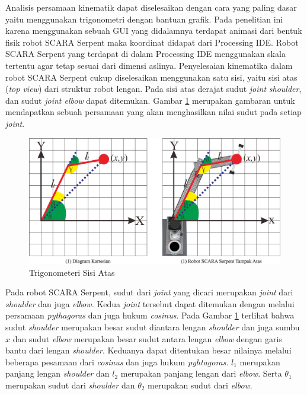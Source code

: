 Analisis persamaan kinematik dapat diselesaikan dengan cara yang paling dasar yaitu menggunakan trigonometri dengan bantuan grafik. Pada penelitian ini karena menggunakan sebuah GUI yang didalamnya terdapat animasi dari bentuk fisik robot SCARA Serpent maka koordinat didapat dari Processing IDE. Robot SCARA Serpent yang terdapat di dalam Processing IDE menggunakan skala tertentu agar tetap sesuai dari dimensi aslinya. Penyelesaian kinematika dalam robot SCARA Serpent cukup diselesaikan menggunakan satu sisi, yaitu sisi atas (\textit{top view}) dari struktur robot lengan. Pada sisi atas derajat sudut \textit{joint} \textit{shoulder}, dan sudut \textit{joint elbow} dapat ditemukan. Gambar \ref{pic.perskinematikabalik} merupakan gambaran untuk mendapatkan sebuah persamaan yang akan menghasilkan nilai sudut pada setiap \textit{joint\cite{koker}}.
\begin{figure}[H]
	\centering
	\includegraphics[width=12cm]{gambar/SCARA_atas.png}
	\caption{Trigonometeri Sisi Atas}
	\label{pic.perskinematikabalik}
\end{figure}


Pada robot SCARA Serpent, sudut dari \textit{joint} yang dicari merupakan \textit{joint} dari \textit{shoulder} dan juga \textit{elbow.} Kedua \textit{joint} tersebut dapat ditemukan dengan melalui persamaan \textit{pythagoras} dan juga hukum \textit{cosinus}. Pada Gambar \ref{pic.perskinematikabalik} terlihat bahwa sudut \textit{shoulder} merupakan besar sudut diantara lengan \textit{shoulder} dan juga sumbu $x$ dan sudut \textit{elbow} merupakan besar sudut antara lengan \textit{elbow} dengan garis bantu dari lengan \textit{shoulder}. Keduanya dapat ditentukan besar nilainya melalui beberapa pesamaan dari \textit{cosinus} dan juga hukum \textit{pyhtagoras}. $l_{1}$ merupakan panjang lengan \textit{shoulder} dan $l_{2}$ merupakan panjang lengan dari \textit{elbow}. Serta $\theta_{1}$ merupakan sudut dari \textit{shoulder} dan $\theta_{2}$ merupakan sudut dari \textit{elbow}\cite{victor}.  

